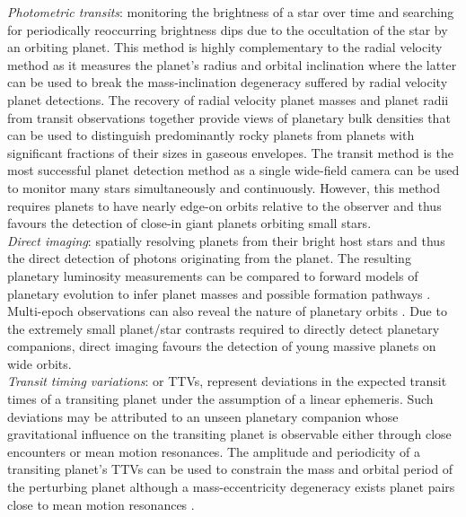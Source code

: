 \emph{Photometric transits}: monitoring the brightness of a star over time and
searching for periodically reoccurring brightness dips due to the occultation of the star
by an orbiting planet. This method is highly complementary to the radial velocity method
as it measures the planet's radius and orbital inclination where the latter can be
used to break the mass-inclination degeneracy suffered by radial velocity planet
detections. The recovery of radial velocity planet masses and planet radii from transit observations
together provide
views of planetary bulk densities that can be used to distinguish predominantly
rocky planets from planets with significant fractions of their sizes in gaseous envelopes.
The transit method is the most successful planet detection method as a single
wide-field camera can be used to monitor many stars simultaneously and continuously.
However, this method requires planets to have nearly edge-on orbits relative to the observer
and thus favours the detection of close-in giant planets orbiting small stars. \\

\emph{Direct imaging}: spatially resolving planets from their bright host stars and thus the
direct detection of photons originating from the planet. The resulting planetary luminosity
measurements can be compared to forward models of planetary
evolution to infer planet masses and possible formation pathways \citep{marley07}.
Multi-epoch observations can also reveal the nature of planetary orbits \citep{wang18}.
Due to the extremely small planet/star contrasts required to directly detect planetary companions,
direct imaging favours the detection of young massive planets on wide orbits. \\

\emph{Transit timing variations}: or TTVs, represent deviations in the expected transit
times of a transiting planet under the assumption of a linear ephemeris. Such deviations
may be attributed to an unseen planetary companion whose gravitational influence on the
transiting planet is observable either through close encounters or mean motion resonances.
The amplitude and periodicity of a transiting planet's TTVs can be used to constrain the mass
and orbital period of the perturbing planet although a mass-eccentricity degeneracy exists
planet pairs close to mean motion resonances \citep{lithwick12}. \\

